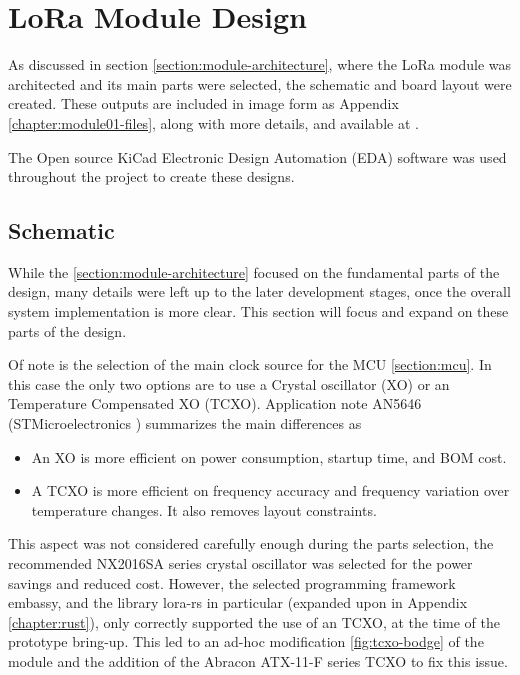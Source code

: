 
\section{LoRa Module Design}
As discussed in section \ref{section:module-architecture}, where the LoRa module was architected and its main parts were selected, the schematic and board layout were created. These outputs are included in image form as Appendix \ref{chapter:module01-files}, along with more details, and available at .

The Open source KiCad Electronic Design Automation (EDA) software was used throughout the project to create these designs.

\subsection{\label{section:module-schematic}Schematic}
While the \ref{section:module-architecture} focused on the fundamental parts of the design, many details were left up to the later development stages, once the overall system implementation is more clear. This section will focus and expand on these parts of the design.

Of note is the selection of the main clock source for the MCU \ref{section:mcu}. In this case the only two options are to use a Crystal oscillator (XO) or an Temperature Compensated XO (TCXO). Application note AN5646 (STMicroelectronics \cite{stmicroelectronics_how_nodate-1}) summarizes the main differences as
\begin{itemize}
    \item An XO is more efficient on power consumption, startup time, and BOM cost.
    \item A TCXO is more efficient on frequency accuracy and frequency variation over temperature changes. It also
    removes layout constraints.
\end{itemize}

This aspect was not considered carefully enough during the parts selection, the recommended NX2016SA series crystal oscillator was selected for the power savings and reduced cost. However, the selected programming framework embassy, and the library lora-rs in particular (expanded upon in Appendix \ref{chapter:rust}), only correctly supported the use of an TCXO, at the time of the prototype bring-up. This led to an ad-hoc modification \ref{fig:tcxo-bodge} of the module and the addition of the Abracon ATX-11-F series TCXO to fix this issue.

